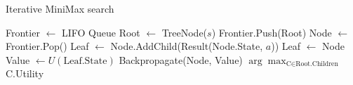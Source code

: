 \begin{algorithm}[H]
    \caption{Iterative MiniMax search}
    \label{alg:iterative_minimax}
    \begin{algorithmic}[1]
    
        \State Frontier $\leftarrow$ LIFO Queue
        \State Root $\leftarrow$ TreeNode($s$)
        \State Frontier.Push(Root)
            \State Node $\leftarrow$ Frontier.Pop() 
             
                \State Leaf $\leftarrow$ Node.AddChild(Result(Node.State, $a$))
            \EndFor
                Leaf $\leftarrow$ Node
            \EndIf
                \State Value $\leftarrow U(\text{Leaf.State})$ 
                \State Backpropagate(Node, Value) 
            \EndIf
        \EndWhile
        \State \Return $\arg\max_{\text{C} \in \text{Root.Children}}$ C.Utility
    \EndProcedure
    \end{algorithmic}
\end{algorithm}